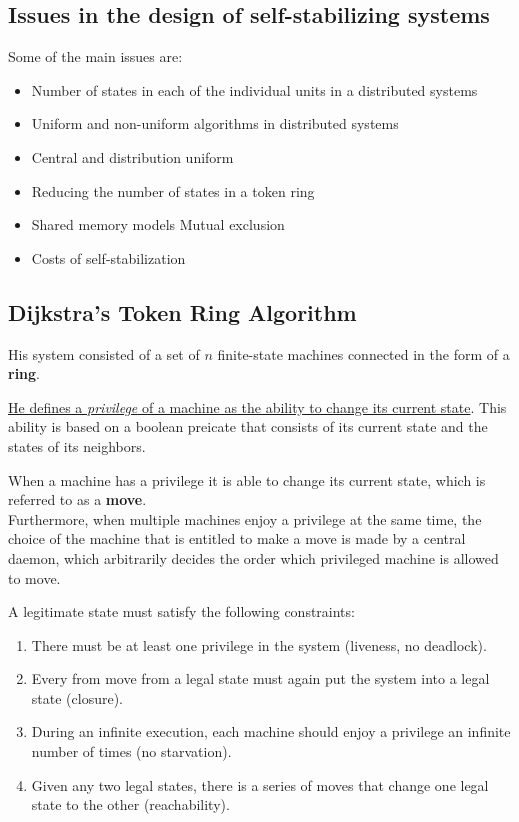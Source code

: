 \subsection{Issues in the design of self-stabilizing systems}
Some of the main issues are:
\begin{itemize}
   \item Number of states in each of the individual units in a distributed systems
   \item Uniform and non-uniform algorithms in distributed systems
   \item Central and distribution uniform
   \item Reducing the number of states in a token ring
   \item Shared memory models Mutual exclusion 
   \item Costs of self-stabilization
\end{itemize}

\subsection{Dijkstra's Token Ring Algorithm}
His system consisted of a set of $n$ finite-state machines connected in the form of a \textbf{ring}.

\ul{He defines a \textit{privilege} of a machine as the ability to change its current state}.
This ability is based on a boolean preicate that consists of its current state and the states of its neighbors.

When a machine has a privilege it is able to change its current state, which is referred to as a \textbf{move}.\\
Furthermore, when multiple machines enjoy a privilege at the same time, the choice of the machine that is entitled to make a move is made by a central daemon, which arbitrarily decides the order which privileged machine is allowed to move.

A legitimate state must satisfy the following constraints:
\begin{enumerate}
   \item There must be at least one privilege in the system (liveness, no deadlock).
   \item Every from move from a legal state must again put the system into a legal state (closure).
   \item During an infinite execution, each machine should enjoy a privilege an infinite number of times (no starvation).
   \item Given any two legal states, there is a series of moves that change one legal state to the other (reachability).
\end{enumerate}

